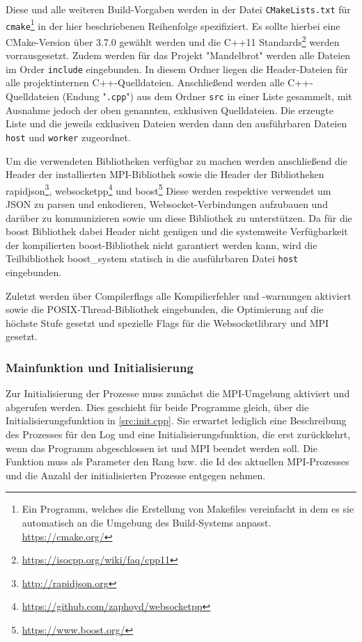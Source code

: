 Diese und alle weiteren Build-Vorgaben werden in der Datei \verb|CMakeLists.txt| für
\verb|cmake|\footnote{Ein Programm, welches die Erstellung von Makefiles vereinfacht in dem es sie automatisch an die Umgebung des Build-Systems anpasst. \url{https://cmake.org/}}
in der hier beschriebenen Reihenfolge spezifiziert.
Es sollte hierbei eine CMake-Version über 3.7.0 gewählt werden und die C++11 Standards\footnote{\url{https://isocpp.org/wiki/faq/cpp11}} werden vorrausgesetzt.
Zudem werden für das Projekt "Mandelbrot" werden alle Dateien im Order \verb|include| eingebunden.
In diesem Ordner liegen die Header-Dateien für alle projektinternen C++-Quelldateien.
Anschließend werden alle C++-Quelldateien (Endung "\verb|.cpp|") aus dem Ordner \verb|src| in einer Liste gesammelt, mit Ausnahme jedoch der oben genannten, exklusiven Quelldateien.
Die erzeugte Liste und die jeweils exklusiven Dateien werden dann den ausführbaren Dateien \verb|host| und \verb|worker| zugeordnet.

Um die verwendeten Bibliotheken verfügbar zu machen werden anschließend die Header der installierten MPI-Bibliothek
sowie die Header der Bibliotheken rapidjson\footnote{\url{http://rapidjson.org}}, websocketpp\footnote{\url{https://github.com/zaphoyd/websocketpp}} und boost\footnote{\url{https://www.boost.org/}}
Diese werden respektive verwendet um JSON zu parsen und enkodieren, Websocket-Verbindungen aufzubauen und darüber zu kommunizieren sowie um diese Bibliothek zu unterstützen.
Da für die boost Bibliothek dabei Header nicht genügen und die systemweite Verfügbarkeit der kompilierten boost-Bibliothek nicht garantiert werden kann, wird die Teilbibliothek boost\_system statisch
in die ausführbaren Datei \verb|host| eingebunden.

Zuletzt werden über Compilerflags alle Kompilierfehler und -warnungen aktiviert sowie die POSIX-Thread-Bibliothek eingebunden,
die Optimierung auf die höchste Stufe gesetzt und spezielle Flags für die Websocketlibrary und MPI gesetzt.

\subsubsection{Mainfunktion und Initialisierung}

Zur Initialisierung der Prozesse muss zunächst die MPI-Umgebung aktiviert und abgerufen werden.
Dies geschieht für beide Programme gleich, über die Initialisierungsfunktion in \autoref{src:init.cpp}.
Sie erwartet lediglich eine Beschreibung des Prozesses für den Log und eine Initialisierungsfunktion,
die erst zurückkehrt, wenn das Programm abgeschlossen ist und MPI beendet werden soll.
Die Funktion muss als Parameter den Rang bzw. die Id des aktuellen MPI-Prozesses und die Anzahl der initialisierten
Prozesse entgegen nehmen.

